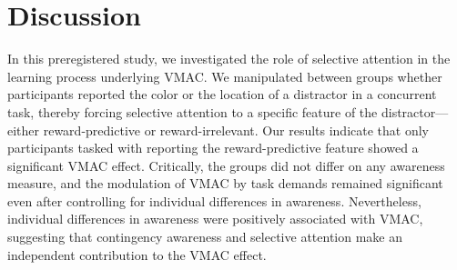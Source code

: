 \documentclass[
  man,
  floatsintext,
  longtable,
  nolmodern,
  notxfonts,
  notimes,
  mask,
  colorlinks=true,linkcolor=blue,citecolor=blue,urlcolor=blue]{apa7}
\begin{document}
\section{Discussion}\label{discussion}

In this preregistered study, we investigated the role of selective
attention in the learning process underlying VMAC. We manipulated
between groups whether participants reported the color or the location
of a distractor in a concurrent task, thereby forcing selective
attention to a specific feature of the distractor---either
reward-predictive or reward-irrelevant. Our results indicate that only
participants tasked with reporting the reward-predictive feature showed
a significant VMAC effect. Critically, the groups did not differ on any
awareness measure, and the modulation of VMAC by task demands remained
significant even after controlling for individual differences in
awareness. Nevertheless, individual differences in awareness were
positively associated with VMAC, suggesting that contingency awareness
and selective attention make an independent contribution to the VMAC
effect.
\end{document}
